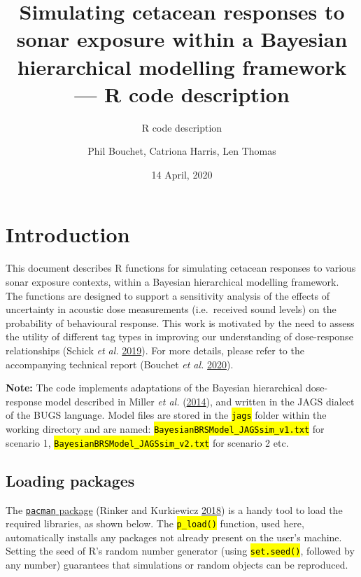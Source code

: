 \documentclass[
]{article}
\title{Simulating cetacean responses to sonar exposure within a Bayesian hierarchical modelling framework --- R code description}
\subtitle{R code description}
\author{Phil Bouchet, Catriona Harris, Len Thomas}
\date{14 April, 2020}
\begin{document}
\maketitle

{
\hypersetup{linkcolor=black}
\setcounter{tocdepth}{3}
\tableofcontents
}
\renewcommand{\figurename}{\textbf{Figure }}
\renewcommand{\caption}{\textbf{Figure }}
\newcommand{\code}[1]{\textcolor{codecolor}{\texttt{\hl{#1}}}}

\section{Introduction}

This document describes R functions for simulating cetacean responses to various sonar exposure contexts, within a Bayesian hierarchical modelling framework. The functions are designed to support a sensitivity analysis of the effects of uncertainty in acoustic dose measurements (i.e.~received sound levels) on the probability of behavioural response. This work is motivated by the need to assess the utility of different tag types in improving our understanding of dose-response relationships (Schick \emph{et al.} \protect\hyperlink{ref-Schick2019}{2019}). For more details, please refer to the accompanying technical report (Bouchet \emph{et al.} \protect\hyperlink{ref-Bouchet2020a}{2020}).

\textbf{Note:} The code implements adaptations of the Bayesian hierarchical dose-response model described in Miller \emph{et al.} (\protect\hyperlink{ref-Miller2014}{2014}), and written in the JAGS dialect of the BUGS language. Model files are stored in the \textcolor{codecolor}{\texttt{\hl{jags}}} folder within the working directory and are named: \textcolor{codecolor}{\texttt{\hl{BayesianBRSModel\_JAGSsim\_v1.txt}}} for scenario 1, \textcolor{codecolor}{\texttt{\hl{BayesianBRSModel\_JAGSsim\_v2.txt}}} for scenario 2 etc.

\subsection{Loading packages}

The \href{https://cran.r-project.org/web/packages/pacman/index.html}{\texttt{pacman} package} (Rinker and Kurkiewicz \protect\hyperlink{ref-Rinker2018}{2018}) is a handy tool to load the required libraries, as shown below. The \textcolor{codecolor}{\texttt{\hl{p\_load()}}} function, used here, automatically installs any packages not already present on the user's machine. Setting the seed of R's random number generator (using \textcolor{codecolor}{\texttt{\hl{set.seed()}}}, followed by any number) guarantees that simulations or random objects can be reproduced.
\end{document}
